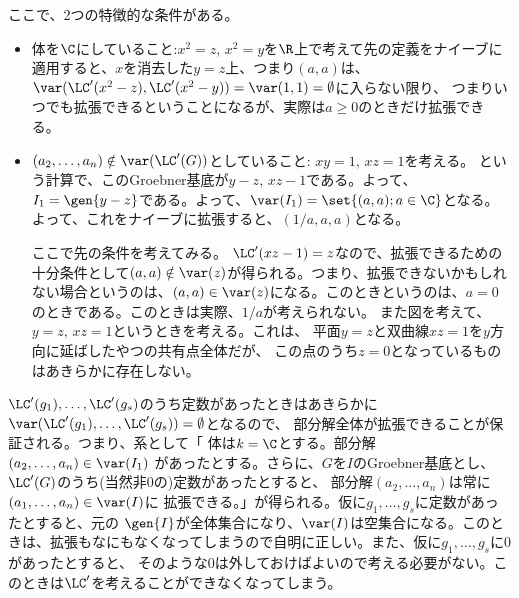 ここで、2つの特徴的な条件がある。
\begin{itemize}
  \item 体を$\C$にしていること:$x^2 = z,\, x^2 = y$を$\R$上で考えて先の定義をナイーブに適用すると、$x$を消去した$y=z$上、つまり$(a,a)$は、
  $\var(\LC'(x^2-z),\LC'(x^2-y))=\var(1,1)=\emptyset$に入らない限り、
  つまりいつでも拡張できるということになるが、実際は$a\ge0 $のときだけ拡張できる。
  \item $(a_2,\dots,a_n) \notin \var(\LC'(G))$としていること:
  $xy=1,\, xz=1$を考える。
  という計算で、このGroebner基底が$y-z,\, xz-1$である。よって、$I_1 = \gen{y-z}$である。よって、$\var(I_1) = \set{(a,a); a\in \C}$となる。
  よって、これをナイーブに拡張すると、$(1/a,a,a)$となる。

  ここで先の条件を考えてみる。
  $\LC'(xz-1)=z$なので、拡張できるための十分条件として$(a,a) \notin \var(z)$が得られる。つまり、拡張できないかもしれない場合というのは、$(a,a) \in \var(z)$になる。このときというのは、$a=0$のときである。このときは実際、$1/a$が考えられない。
  また図を考えて、$y=z,\, xz=1$というときを考える。これは、
  平面$y=z$と双曲線$xz=1$を$y$方向に延ばしたやつの共有点全体だが、
  この点のうち$z=0$となっているものはあきらかに存在しない。

\end{itemize}

$\LC'(g_1),\dots,\LC'(g_s)$のうち定数があったときはあきらかに$\var(\LC'(g_1),\dots,\LC'(g_s)) = \emptyset$となるので、
部分解全体が拡張できることが保証される。つまり、系として「
体は$k=\C$とする。部分解$(a_2,\dots,a_n)\in \var(I_1)$
があったとする。さらに、$G$を$I$のGroebner基底とし、
$\LC'(G)$のうち(当然非0の)定数があったとすると、
部分解$(a_2,\dots,a_n)$は常に$(a_1,\dots,a_n) \in \var(I)$に
拡張できる。」が得られる。仮に$g_1,\dots,g_s$に定数があったとすると、元の
$\gen{I}$が全体集合になり、$\var(I)$は空集合になる。このときは、拡張もなにもなくなってしまうので自明に正しい。また、仮に$g_1,\dots,g_s$に0があったとすると、
そのような0は外しておけばよいので考える必要がない。このときは$\LC'$を考えることができなくなってしまう。

